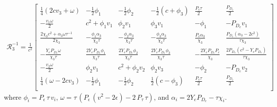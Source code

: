 \begin{align*}
  \mathcal{R}_{3}^{-1} = \frac{1}{c^2}
  \left[
  \begin{array}{cccccc}
   \frac{1}{4} (2 c v_{3}+\omega ) & -\frac{1}{2} \phi_{1} & -\frac{1}{2} \phi_{2}
    & -\frac{1}{2}(c+\phi_{3})  & \frac{P_{\epsilon} \tau }{2} & \frac{P_{D_{e}}}{2}
     \\
   -\frac{v_{1} \omega }{2} & c^2 + \phi_{1} v_{1}  & \phi_{2} v_{1}  &
     \phi_{3} v_{1}  & -\phi_{1}  & -P_{D_{e}} v_{1}
     \\
   \frac{2 \chi_{3}  c^2+\alpha_{3}  \omega \tau^{-1} }{2 \chi_{3} } & -\frac{\phi_{1} \alpha_{3}  }{\chi_{3} \tau } &
     -\frac{\phi_{2} \alpha_{3}  }{\chi_{3} \tau } & -\frac{\phi_{3} \alpha_{3} }{\chi_{3} \tau } &
     \frac{P_{\epsilon} \alpha_{3} }{\chi_{3} } & \frac{P_{D_{e}} \left(\alpha_{3} -2 c^2\right)}{\tau \chi_{3} }
      \\
   -\frac{Y_{e} P_{D_{e}} \omega }{\chi_{3} \tau } & \frac{2 Y_{e} P_{D_{e}} \phi_{1} }{\chi_{3} \tau } & \frac{2 Y_{e} P_{D_{e}}
     \phi_{2} }{\chi_{3} \tau} & \frac{2 Y_{e} P_{D_{e}} \phi_{3} }{\chi_{3} \tau} & -\frac{2 Y_{e}
     P_{D_{e}} P_{\epsilon} }{\chi_{3} } & \frac{2 P_{D_{e}} \left(c^2-Y_{e} P_{D_{e}} \right)}{\tau \chi_{3} }
      \\
   -\frac{v_{2} \omega }{2} & \phi_{2} v_{1}  & c^2+\phi_{2} v_{2}   &
     \phi_{2} v_{3}  & -\phi_{2}  & -P_{D_{e}} v_{2}
      \\
   \frac{1}{4} (\omega -2 c  v_{3}) & -\frac{1}{2} \phi_{1}  & -\frac{1}{2} \phi_{2}
       & \frac{1}{2} (c-\phi_{3})  & \frac{P_{\epsilon} \tau }{2} & \frac{P_{D_{e}}}{2}
     \\
  \end{array}
  \right]
\end{align*}
where $\phi_{i} = P_{\epsilon}\,\tau\, v_{i}$,
$\omega = \tau\, (P_{\epsilon}\,(v^2 - 2\epsilon) - 2\,P_{\tau}\,\tau)$, and
$\alpha_{i} = 2 Y_{e} P_{D_{e}} - \tau \chi_{i}$.

